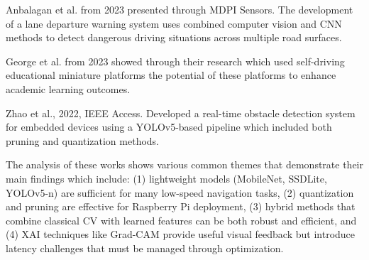 \documentclass[conference]{IEEEtran}
\begin{document}
Anbalagan et al. from 2023 presented through MDPI Sensors. The development of a lane departure warning system uses combined computer vision and CNN methods to detect dangerous driving situations across multiple road surfaces.

George et al. from 2023 showed through their research which used self-driving educational miniature platforms the potential of these platforms to enhance academic learning outcomes.

Zhao et al., 2022, IEEE Access. Developed a real-time obstacle detection system for embedded devices using a YOLOv5-based pipeline which included both pruning and quantization methods.

The analysis of these works shows various common themes that demonstrate their main findings which include: (1) lightweight models (MobileNet, SSDLite, YOLOv5-n) are sufficient for many low-speed navigation tasks, (2) quantization and pruning are effective for Raspberry Pi deployment, (3) hybrid methods that combine classical CV with learned features can be both robust and efficient, and (4) XAI techniques like Grad-CAM provide useful visual feedback but introduce latency challenges that must be managed through optimization.
\end{document}
